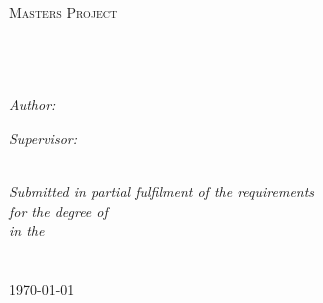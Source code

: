 \documentclass[11pt, a4paper, oneside]{Thesis} %
\begin{document}
\begin{titlepage}
\begin{center}

\textsc{\Large Masters Project}\\[0.5cm] %

\HRule \\[0.4cm] %
{\huge \bfseries \ttitle}\\[0.4cm] %
\HRule \\[1.5cm] %
 
\begin{minipage}{0.4\textwidth}
\begin{flushleft} \large
\emph{Author:}\\
\authornames %
\end{flushleft}
\end{minipage}
\begin{minipage}{0.4\textwidth}
\begin{flushright} \large
\emph{Supervisor:} \\
\supname %
\end{flushright}
\end{minipage}\\[3cm]
 
\large \textit{Submitted in partial fulfilment of the requirements\\ for the degree of \degreename}\\[0.3cm] %
\textit{in the}\\[0.4cm]
\deptname\\\univname\\[2cm] %
 
{\large \today}\\[4cm] %
 
\vfill
\end{center}

\end{titlepage}

\end{document}
